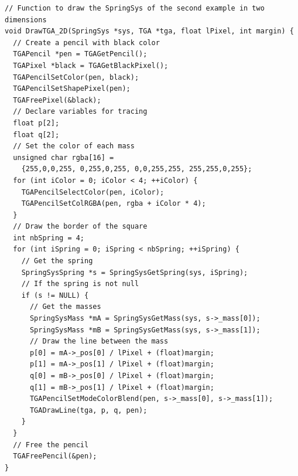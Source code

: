 \documentclass[12pt, a4paper]{article}
\begin{document}
\begin{scriptsize}
\begin{ttfamily}
\begin{lstlisting}
// Function to draw the SpringSys of the second example in two dimensions
void DrawTGA_2D(SpringSys *sys, TGA *tga, float lPixel, int margin) {
  // Create a pencil with black color
  TGAPencil *pen = TGAGetPencil();
  TGAPixel *black = TGAGetBlackPixel();
  TGAPencilSetColor(pen, black);
  TGAPencilSetShapePixel(pen);
  TGAFreePixel(&black);
  // Declare variables for tracing
  float p[2];
  float q[2];
  // Set the color of each mass
  unsigned char rgba[16] = 
    {255,0,0,255, 0,255,0,255, 0,0,255,255, 255,255,0,255};
  for (int iColor = 0; iColor < 4; ++iColor) {
    TGAPencilSelectColor(pen, iColor);
    TGAPencilSetColRGBA(pen, rgba + iColor * 4);
  }
  // Draw the border of the square
  int nbSpring = 4;
  for (int iSpring = 0; iSpring < nbSpring; ++iSpring) {
    // Get the spring
    SpringSysSpring *s = SpringSysGetSpring(sys, iSpring);
    // If the spring is not null
    if (s != NULL) {
      // Get the masses
      SpringSysMass *mA = SpringSysGetMass(sys, s->_mass[0]);
      SpringSysMass *mB = SpringSysGetMass(sys, s->_mass[1]);
      // Draw the line between the mass
      p[0] = mA->_pos[0] / lPixel + (float)margin;
      p[1] = mA->_pos[1] / lPixel + (float)margin;
      q[0] = mB->_pos[0] / lPixel + (float)margin;
      q[1] = mB->_pos[1] / lPixel + (float)margin;
      TGAPencilSetModeColorBlend(pen, s->_mass[0], s->_mass[1]);
      TGADrawLine(tga, p, q, pen);
    }
  }
  // Free the pencil
  TGAFreePencil(&pen);
}


\end{lstlisting}
\end{ttfamily}
\end{scriptsize}
\end{document}
